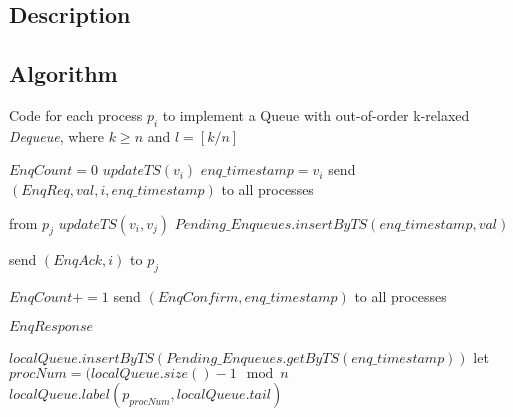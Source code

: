 \documentclass[a4paper,USenglish]{lipics-v2021} %
\begin{document}
\subsection{Description}

\subsection{Algorithm}

\begin{algorithm}
  \caption{Code for each process $p_i$ to implement a Queue with out-of-order k-relaxed \textit{Dequeue}, where $k \geq n$ and $l = [k/n]$}
  \begin{algorithmic}[1]
      \State $EnqCount = 0$
      \State $updateTS(v_i)$
      \State $enq\_timestamp = v_i$
      \State send $(EnqReq, val, i, enq\_timestamp)$ to all processes
    \EndFunction

     from $p_j$
      \State $updateTS(v_i, v_j)$
        \State $Pending\_Enqueues.insertByTS(enq\_timestamp, val)$
      \EndIf

      \State send $(EnqAck, i)$ to $p_j$
    \EndFunction

      \State $EnqCount += 1$
          \State send $(EnqConfirm, enq\_timestamp)$ to all processes
        \EndIf
      \EndIf

      \State \Return $EnqResponse$
    \EndFunction

      \State $localQueue.insertByTS(Pending\_Enqueues.getByTS(enq\_timestamp))$
       
        \State let $procNum = (localQueue.size() -1 \mod n$
        \State $localQueue.label(p_{procNum}, localQueue.tail)$
      \EndIf
    \EndFunction
  \end{algorithmic}
\end{algorithm}
\end{document}
